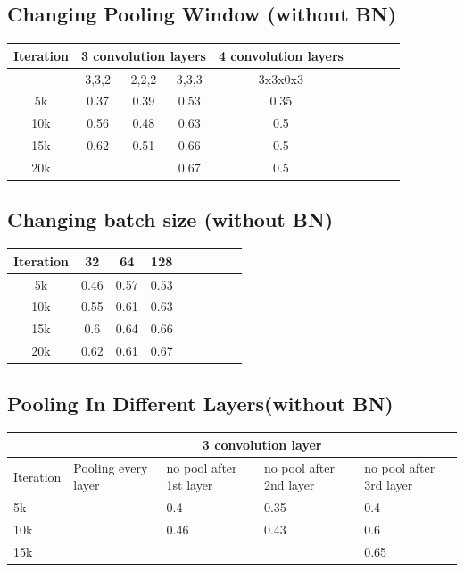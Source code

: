 \documentclass[journal,onecolumn]{IEEEtran}
\begin{document}
\subsection{Changing Pooling Window (without BN)}
\begin{tabular}{*9c}
  \hline
Iteration & \multicolumn{3}{c}{3 convolution layers} & \multicolumn{1}{c}{4 convolution layers} \\
\hline
{} & 3,3,2 & 2,2,2 & 3,3,3 & 3x3x0x3 \\
\hline
5k & 0.37 & 0.39 & 0.53 & 0.35 \\
10k & 0.56 & 0.48 & 0.63 & 0.5 \\
15k & 0.62 & 0.51 & 0.66 & 0.5 \\
20k & {} & {} & 0.67 & 0.5 \\
\hline
\end{tabular}

\subsection{Changing batch size (without BN)}
\begin{tabular}{*9c}
  \hline
Iteration & 32 & 64 & 128\\
\hline
5k & 0.46 & 0.57 & 0.53 \\
10k & 0.55 & 0.61 & 0.63 \\
15k & 0.6 & 0.64 & 0.66 \\
20k & 0.62 & 0.61 & 0.67 \\
\hline
\end{tabular}

\subsection{Pooling In Different Layers(without BN)}
\begin{tabular}{*5{p{2cm}}}
  \hline
  {} & \multicolumn{4}{c}{3 convolution layer} \\
  \hline
  Iteration & Pooling every layer & no pool after 1st layer & no pool after 2nd layer & no pool after 3rd layer \\
  \hline
  5k & {} & 0.4 & 0.35 & 0.4 \\
  10k & {} & 0.46 & 0.43 & 0.6 \\
  15k & {} & {} & {} & 0.65 \\
  \hline
\end{tabular}
\end{document}
